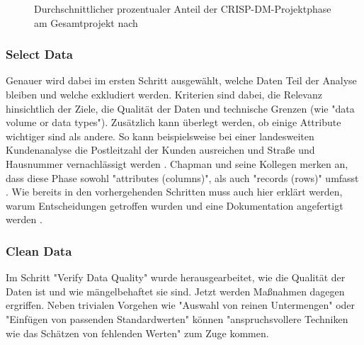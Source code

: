 \begin{figure}[H]
\centering
{}
\caption{Durchschnittlicher prozentualer Anteil der CRISP-DM-Projektphase am Gesamtprojekt nach \citep[S.~15; eigene Darstellung]{shearer_crisp-dm_2000}}
\label{fig:CRISP_DM_percent}
\end{figure}

\subsubsection{Select Data}
Genauer wird dabei im ersten Schritt ausgewählt, welche Daten Teil der Analyse bleiben und welche exkludiert werden. Kriterien sind dabei, die Relevanz hinsichtlich der Ziele, die Qualität der Daten und technische Grenzen\citep[S.~16]{shearer_crisp-dm_2000} (wie "data volume or data types"\citep[S.~21]{chapman_crisp-dm_2000}). Zusätzlich kann überlegt werden, ob einige Attribute wichtiger sind als andere. So kann beispielsweise bei einer landesweiten Kundenanalyse die Postleitzahl der Kunden ausreichen und Straße und Hausnummer vernachlässigt werden \citep[S.~16]{shearer_crisp-dm_2000}. Chapman und seine Kollegen merken an, dass diese Phase sowohl "attributes (columns)", als auch "records (rows)" umfasst \citep[S.21]{chapman_crisp-dm_2000}. Wie bereits in den vorhergehenden Schritten muss auch hier erklärt werden, warum Entscheidungen getroffen wurden und eine Dokumentation angefertigt werden \citep[S.~16]{shearer_crisp-dm_2000}.

\subsubsection{Clean Data}
Im Schritt "Verify Data Quality" wurde herausgearbeitet, wie die Qualität der Daten ist und wie mängelbehaftet sie sind. Jetzt werden Maßnahmen dagegen ergriffen. Neben trivialen Vorgehen wie "Auswahl von reinen Untermengen" oder "Einfügen von passenden Standardwerten" können "anspruchsvollere Techniken wie das Schätzen von fehlenden Werten"\citep[S.21; eigene Übersetzung]{chapman_crisp-dm_2000} zum Zuge kommen.

